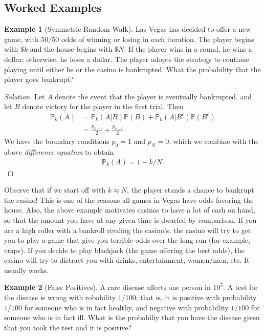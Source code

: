 \documentclass[12pt]{article}
\newcommand{\dollar}{\$}
\newcommand{\prob}{\mathbb{P}}
\theoremstyle{plain}
\theoremstyle{definition}
\newtheorem*{example}{Example}
\theoremstyle{remark}
\numberwithin{equation}{section}  %
\begin{document}
\subsection{Worked Examples}
\begin{example}[Symmetric Random Walk]
Las Vegas has decided to offer a new game, with $50/50$ odds
of winning or losing in each iteration. The player begins with $\dollar k$
and the house begins with $ \dollar N$. If the player wins in a round,
he wins a dollar; otherwise, he loses a dollar. The player adopts the strategy
to continue playing until either he or the casino is bankrupted.
What the probability that the player goes bankrupt?
\end{example}
\begin{proof}[Solution]
Let $A$ denote the event that the player is eventually bankrupted,
and let $B$ denote victory for the player in the first trial.
Then
\begin{align*}
\prob_k(A)
& = \prob_k(A | B) \prob(B) + \prob_k(A | B^c) \prob(B^c)
\\
& = \frac{p_{k+1}}{2} + \frac{p_{k-1}}{2}
\end{align*}
We have the boundary conditions $p_0 = 1$ and $p_N = 0$, which we combine with
the above \emph{difference equation} to obtain
\begin{align*}
\prob_k(A) = 1 - k/N.
\end{align*}
\end{proof}
Observe that if we start off with $k \approx N$, the player stands a chance to
bankrupt the casino! This is one of the reasons all games in Vegas have odds
favoring the house. Also, the above example motivates casinos to have a lot of
cash on hand, so that the amount you have at any given time is dwarfed by
comparison. If you are a high roller with a bankroll rivaling the casino's,
the casino will try to get you to play a game that give you terrible odds over
the long run (for example, craps). If you decide to play blackjack (the game
offering the best odds), the casino will try to distract you with drinks,
entertainment, women/men, etc. It usually works.
\begin{example}[False Positives]
A rare disease affects one person in $10^5$. A test for the disease
is wrong with robability $1/100$; that is, it is positive with probability
$1/100$ for someone who is in fact healthy, and negative
with probability $1/100$ for someone who is in fact ill. What is the probabiliy
that you have the disease given that you took the test and it is positive?
\end{example}
\end{document}
